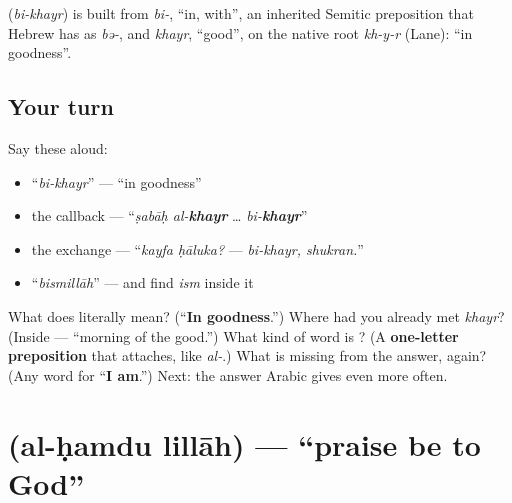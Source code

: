 \begin{cousinweb}
\textbf{} (\emph{bi-khayr}) is built from \emph{bi-}, \textquotedblleft{}in, with\textquotedblright{}, an inherited Semitic preposition that Hebrew has as \emph{bə-}, and \emph{khayr}, \textquotedblleft{}good\textquotedblright{}, on the native root \emph{kh-y-r} (Lane): \textquotedblleft{}in goodness\textquotedblright{}.
\end{cousinweb}

\subsection*{Your turn}
Say these aloud:

\begin{itemize}
\raggedright
  \item \textquotedblleft{}\emph{bi-khayr}\textquotedblright{} — \textquotedblleft{}in goodness\textquotedblright{}
  \item the callback — \textquotedblleft{}\emph{ṣabāḥ al-\textbf{khayr}} … \emph{bi-\textbf{khayr}}\textquotedblright{}
  \item the exchange — \textquotedblleft{}\emph{kayfa ḥāluka?} — \emph{bi-khayr, shukran.}\textquotedblright{}
  \item \textquotedblleft{}\emph{bismillāh}\textquotedblright{} — and find \emph{ism} inside it
\end{itemize}

\begin{tcolorbox}[breakable,colback=teal!4,colframe=teal!35!black,title={Before you move on}]
What does \textbf{} literally mean? (\textquotedblleft{}\textbf{In goodness}.\textquotedblright{}) Where had you already met \emph{khayr}? (Inside \textbf{ } — \textquotedblleft{}morning of the good.\textquotedblright{}) What kind of word is \textbf{}? (A \textbf{one-letter preposition} that attaches, like \emph{al-}.) What is missing from the answer, again? (Any word for \textquotedblleft{}\textbf{I am}.\textquotedblright{}) Next: the answer Arabic gives even more often.
\end{tcolorbox}
\section[\texorpdfstring{\ar{الحمد} \ar{لله} (al-ḥamdu lillāh)}{الحمد لله (al-ḥamdu lillāh)}]{  (al-ḥamdu lillāh) — \textquotedblleft{}praise be to God\textquotedblright{}}

\label{lesson:AR-C03-al-hamdu-lillah}



